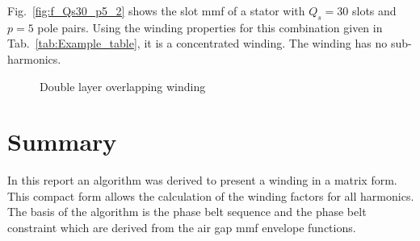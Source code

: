 Fig.~\ref{fig:f_Qs30_p5_2} shows the slot mmf of a stator with $Q_s=30$ slots and $p=5$ pole pairs. Using the winding properties for this combination given in Tab.~\ref{tab:Example_table}, it is a concentrated winding. The winding has no sub-harmonics. 
\begin{figure}[htbp]
  \centering
  \fontsize{6}{6}\selectfont
  \hfill
  \caption{Double layer overlapping winding}
  \label{Main_double_overlapping}
\end{figure}

\clearpage
\section{Summary}
In this report an algorithm was derived to present a winding in a matrix form. This compact form allows the calculation of the winding factors for all harmonics. The basis of the algorithm is the phase belt sequence and the phase belt constraint which are derived from the air gap mmf envelope functions. 

